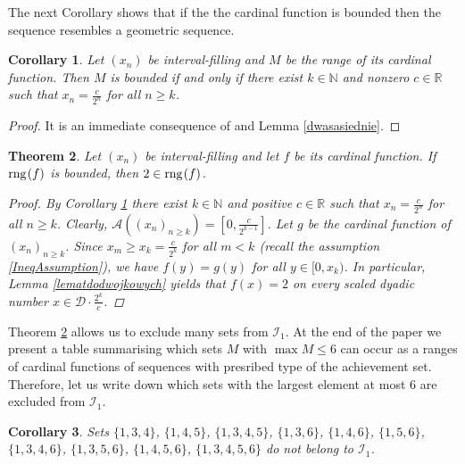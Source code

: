\documentclass{amsart}
\newtheorem{theorem}{Theorem}[section]
\newtheorem{corollary}[theorem]{Corollary}
\theoremstyle{definition}
\newcommand{\rng}{{\rm rng} \hspace{0.03cm}}
\begin{document}
The next Corollary shows that if the the cardinal function is bounded then the sequence resembles a geometric sequence. 

\begin{corollary}\label{geometrycznyogon}
Let $(x_n)$ be interval-filling and $M$ be the range of its cardinal function. Then $M$ is bounded if and only if there exist $k\in\mathbb{N}$ and nonzero $c\in\mathbb{R}$ such that $x_n=\frac{c}{2^n}$ for all $n\geq k$.
\end{corollary}
\begin{proof}
It is an immediate consequence of \cite[Theorem 3.8]{cardfun} and Lemma \ref{dwasasiednie}.
\end{proof}

\begin{theorem}\label{musibycdwojka}
Let $(x_n)$ be interval-filling and let $f$ be its cardinal function. If $\rng (f)$ is bounded, then $2\in \rng (f)$. 
\begin{proof}
By Corollary \ref{geometrycznyogon} there exist $k\in\mathbb{N}$ and positive $c\in\mathbb{R}$ such that $x_n=\frac{c}{2^n}$ for all $n\geq k$. Clearly, $\mathcal{A}((x_n)_{n\geq k})=[0,\frac{c}{2^{k-1}}]$. Let $g$ be the cardinal function of $(x_n)_{n\geq k}$. Since $x_m\geq x_k=\frac{c}{2^k}$ for all $m<k$ (recall the assumption \eqref{IneqAssumption}), we have $f(y)=g(y)$ for all $y\in [0,x_k)$. In particular, Lemma \ref{lematdodwojkowych} yields that $f(x)=2$ on every scaled dyadic number $x\in \mathcal{D}\cdot\frac{2^k}{c}$.
\end{proof}
\end{theorem}

Theorem \ref{musibycdwojka} allows us to exclude many sets from $\mathcal{I}_1$. At the end of the paper we present a table summarising which sets $M$ with $\max M\leq 6$ can occur as a ranges of cardinal functions of sequences with presribed type of the achievement set. Therefore, let us write down which sets with the largest element at most $6$ are excluded from $\mathcal{I}_{1}$.

\begin{corollary} \label{jedentrzyczteryprzedzial}
Sets $\{1,3,4\}$, $\{1,4,5\}$, $\{1,3,4,5\}$, $\{1,3,6\}$, $\{1,4,6\}$, $\{1,5,6\}$, $\{1,3,4,6\}$, $\{1,3,5,6\}$, $\{1,4,5,6\}$, $\{1,3,4,5,6\}$ do not belong to $\mathcal{I}_1$.
\end{corollary}
\end{document}
